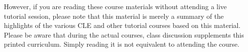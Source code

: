 \documentclass[10pt, letterpaper]{book}
\begin{document}
However, if you are reading these course materials without attending a live
tutorial session, please note that this material is merely a summary of the
highlights of the various CLE and other tutorial courses based on this
material.  Please be aware that during the actual courses, class discussion
supplements this printed curriculum.  Simply reading it is not equivalent to
attending the course.

\tableofcontents

\mainmatter



%

%
\end{document}
